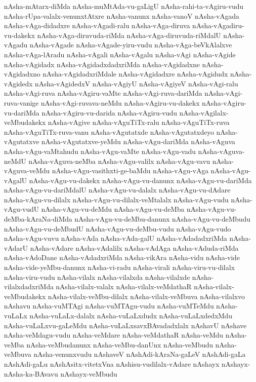 {nAsha-mAtarx-diMda
nAsha-muMtAda-vu-gaLigU
nAsha-rahi-ta-vAgiru-vudu
nAsha-rUpa-valalx-venunxtAtxre
nAsha-vanunx
nAsha-vanoV
nAsha-vAgada
nAsha-vAga-didadxre
nAsha-vAgadi-ralu
nAsha-vAga-diruva
nAsha-vAgadiru-vu-dakekx
nAsha-vAga-diruvuda-riMda
nAsha-vAga-diruvuda-riMdalU
nAsha-vAgadu
nAsha-vAgade
nAsha-vAgade-yiru-vudu
nAsha-vAga-beVkAlalxve
nAsha-vAga-lAradu
nAsha-vAgali
nAsha-vAgalu
nAsha-vAgi
nAsha-vAgide
nAsha-vAgidadx
nAsha-vAgidadxdadxriMda
nAsha-vAgidadxne
nAsha-vAgidadxno
nAsha-vAgidadxriMdale
nAsha-vAgidadxre
nAsha-vAgidudx
nAsha-vAgidedx
nAsha-vAgidedxV
nAsha-vAgiyU
nAsha-vAgiyeV
nAsha-vAgi-ralu
nAsha-vAgi-ruva
nAsha-vAgiru-vaMte
nAsha-vAgi-ruva-dariMda
nAsha-vAgi-ruva-vanige
nAsha-vAgi-ruvava-neMdu
nAsha-vAgiru-vu-dakekx
nAsha-vAgiru-vu-dariMda
nAsha-vAgiru-vu-darida
nAsha-vAgiru-vudu
nAsha-vAgilalx-veMbudakekx
nAsha-vAgive
nAsha-vAguTiTx-ralu
nAsha-vAguTiTx-ruva
nAsha-vAguTiTx-ruva-vanu
nAsha-vAgutatxde
nAsha-vAgutatxdeyo
nAsha-vAgutatxve
nAsha-vAgutatxve-yeMdu
nAsha-vAgu-dariMda
nAsha-vAguva
nAsha-vAgu-vaMtahudu
nAsha-vAgu-vaMte
nAsha-vAgu-vadu
nAsha-vAguva-neMdU
nAsha-vAguva-neMba
nAsha-vAgu-valilx
nAsha-vAgu-vavu
nAsha-vAguva-veMdu
nAsha-vAgu-vasithxti-ge-baMdu
nAsha-vAgu-vAga
nAsha-vAgu-vAgalU
nAsha-vAgu-vu-dakekx
nAsha-vAgu-vu-danunx
nAsha-vAgu-vu-dariMda
nAsha-vAgu-vu-dariMdalU
nAsha-vAgu-vu-dalalx
nAsha-vAgu-vu-dAdare
nAsha-vAgu-vu-dilalx
nAsha-vAgu-vu-dilalx-veMtalalx
nAsha-vAgu-vudu
nAsha-vAgu-vudU
nAsha-vAgu-vu-deMdu
nAsha-vAgu-vu-deMba
nAsha-vAgu-vu-deMba-kAraNa-diMda
nAsha-vAgu-vu-deMbu-danunx
nAsha-vAgu-vu-deMbudu
nAsha-vAgu-vu-deMbudU
nAsha-vAgu-vu-deMbu-vudu
nAsha-vAgu-vudo
nAsha-vAgu-vuvu
nAsha-vAda
nAsha-vAda-galU
nAsha-vAdadadxriMda
nAsha-vAdarU
nAsha-vAdare
nAsha-vAdalilx
nAsha-vAdAga
nAsha-vAduda-riMda
nAsha-vAdoDane
nAsha-vAdadxriMda
nAsha-vikAra
nAsha-vidu
nAsha-vide
nAsha-vide-yeMbu-danunx
nAsha-vi-radu
nAsha-virali
nAsha-viru-vu-dilalx
nAsha-viru-vudu
nAsha-vilalx
nAsha-vilalxda
nAsha-vilalxde
nAsha-vilalxdadxriMda
nAsha-vilalx-valalx
nAsha-vilalx-veMdathaR
nAsha-vilalx-veMbudakekx
nAsha-vilalx-veMbu-dilalx
nAsha-vilalx-veMbuva
nAsha-vilalxvo
nAshavu
nAsha-vuMTAgi
nAsha-vuMTAgu-vudu
nAsha-vuMTeMdu
nAsha-vuLaLx
nAsha-vuLaLx-dalalx
nAsha-vuLaLxdudx
nAsha-vuLaLxdedxMdu
nAsha-vuLaLxvu-gaLeMdu
nAsha-vuLaLxsavxBAvadadxlalx
nAshavU
nAshave
nAsha-veMdagu-vudu
nAsha-veMdare
nAsha-veMdathaR
nAsha-veMdu
nAsha-veMba
nAsha-veMbudanunx
nAsha-veMbu-danUnx
nAsha-veMbudu
nAsha-veMbuva
nAsha-venunxvudu
nAshaveV
nAshAdi-kAraNa-gaLeV
nAshAdi-gaLa
nAshAdi-gaLu
nAshAsitx-vitetxVna
nAshisu-vudilalx-vAdare
nAshayx
nAshayx-nAsha-ka-BAvavu
nAshayx-veMbudu
}
